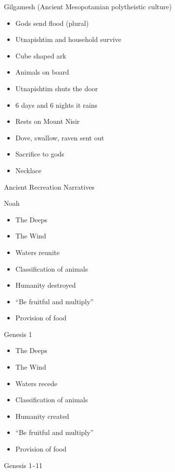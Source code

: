 \documentclass{article}
\begin{document}
    Gilgamesh (Ancient Mesopotamian polytheistic culture)

    \begin{itemize}
        \item Gods send flood (plural)
        \item Utnapishtim and household survive
        \item Cube shaped ark
        \item Animals on board
        \item Utnapishtim shuts the door
        \item 6 days and 6 nights it rains
        \item Rests on Mount Nisir
        \item Dove, swallow, raven sent out
        \item Sacrifice to gods
        \item Necklace
    \end{itemize}

    \centerline{Ancient Recreation Narratives}

    Noah

    \begin{itemize}
        \item The Deeps
        \item The Wind
        \item Waters reunite
        \item Classification of animals
        \item Humanity destroyed
        \item ``Be fruitful and multiply''
        \item Provision of food
    \end{itemize}

    Genesis 1

    \begin{itemize}
        \item The Deeps
        \item The Wind
        \item Waters recede
        \item Classification of animals
        \item Humanity created
        \item ``Be fruitful and multiply''
        \item Provision of food
    \end{itemize}

    \centerline{Genesis 1\texttt{-}11}
\end{document}
